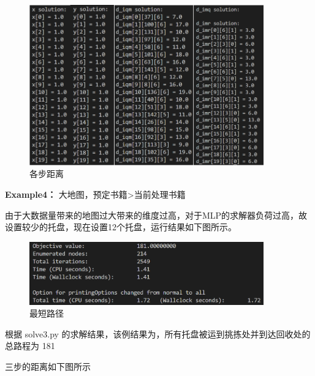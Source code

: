 \documentclass[withoutpreface,bwprint]{thesis-config}
\begin{document}
\begin{figure}[!htbp]
    \centering
    \begin{minipage}[b]{\linewidth}
        \centering
        \includegraphics[width=0.9\textwidth]{figures/result2.4.png}
        \caption{各步距离}
    \end{minipage}
\end{figure}

\newpage
\par \textbf{Example4：} 大地图，预定书籍>当前处理书籍
\par 由于大数据量带来的地图过大带来的维度过高，对于MLP的求解器负荷过高，故设置较少的托盘，现在设置12个托盘，运行结果如下图所示。

\begin{figure}[!htbp]
    \centering
    \begin{minipage}[b]{\linewidth}
        \centering
        \includegraphics[width=0.9\textwidth]{figures/result2.5.png}
        \caption{最短路径}
    \end{minipage}
\end{figure}

\par 根据 solve3.py 的求解结果，该例结果为，所有托盘被运到挑拣处并到达回收处的总路程为 181

\par 三步的距离如下图所示
\end{document}

